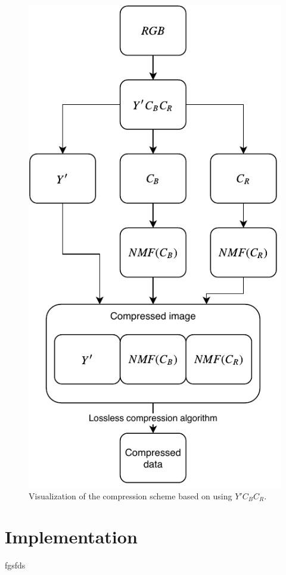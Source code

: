 \documentclass[thesis=M,english]{FITthesis}[2012/10/20]
\begin{document}
\begin{figure}[h]
  \centering
  \includegraphics{nmf-scheme}
  \caption{Visualization of the compression scheme based on using $Y'C_BC_R$.}
  \label{fig:nmf-scheme}
\end{figure}




\chapter{Implementation}
\label{ch:implementation}
fgsfds
\end{document}
